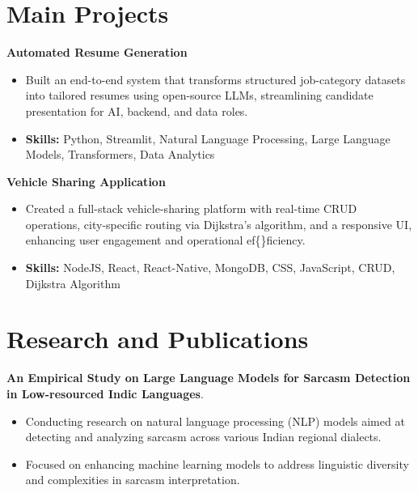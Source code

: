 \documentclass[a4paper,11pt]{article}
\begin{document}
\section{\textbf{Main Projects}}

\vspace{1mm}
  \textbf{Automated Resume Generation  }
\vspace{-1.5mm} %
\begin{itemize}
  \item Built an end-to-end system that transforms structured job-category datasets into tailored resumes using open-source LLMs, streamlining candidate presentation for AI, backend, and data roles.
\vspace{-3mm}
  \item \textbf{Skills:} Python, Streamlit, Natural Language Processing, Large Language Models, Transformers, Data Analytics
\end{itemize}


\vspace{1mm}
   \textbf{Vehicle Sharing Application }
\vspace{-1.5mm} %
\begin{itemize}
  \item Created a full-stack vehicle-sharing platform with real-time CRUD operations, city-specific routing via Dijkstra's algorithm, and a responsive UI, enhancing user engagement and operational ef\{\}ficiency.
\vspace{-3mm}
  \item \textbf{Skills:} NodeJS, React, React-Native, MongoDB, CSS, JavaScript, CRUD, Dijkstra Algorithm
\end{itemize}



\section{\textbf{Research and Publications} \hfill }
\vspace{1mm}
  \textbf{An Empirical Study on Large Language Models for Sarcasm Detection in Low-resourced Indic Languages}.
\vspace{-1mm} %
\begin{itemize}
  \item Conducting research on natural language processing (NLP) models aimed at detecting and analyzing sarcasm across various Indian regional dialects.
\vspace{-3mm}
  \item Focused on enhancing machine learning models to address linguistic diversity and complexities in sarcasm interpretation.
\end{itemize}
\end{document}
